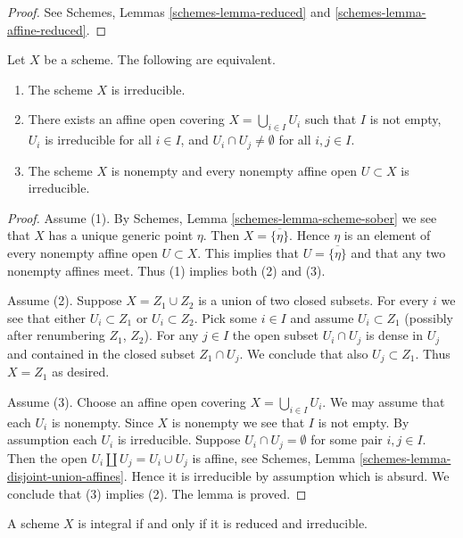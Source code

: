 \begin{proof}
See Schemes, Lemmas \ref{schemes-lemma-reduced} and
\ref{schemes-lemma-affine-reduced}.
\end{proof}

\begin{lemma}
\label{lemma-characterize-irreducible}
Let $X$ be a scheme.
The following are equivalent.
\begin{enumerate}
\item The scheme $X$ is irreducible.
\item There exists an affine open covering $X = \bigcup_{i \in I} U_i$
such that $I$ is not empty, $U_i$ is irreducible for all $i \in I$, and
$U_i \cap U_j \not = \emptyset$ for all $i, j \in I$.
\item The scheme $X$ is nonempty and every nonempty affine open
$U \subset X$ is irreducible.
\end{enumerate}
\end{lemma}

\begin{proof}
Assume (1). By Schemes, Lemma \ref{schemes-lemma-scheme-sober}
we see that $X$ has a unique generic point $\eta$. Then
$X = \overline{\{\eta\}}$. Hence $\eta$ is an element of
every nonempty affine open $U \subset X$. This implies
that $U = \overline{\{\eta\}}$ and that any two nonempty affines
meet. Thus (1) implies both (2) and (3).

\medskip\noindent
Assume (2). Suppose $X = Z_1 \cup Z_2$ is a union of two closed subsets.
For every $i$ we see that either $U_i \subset Z_1$ or $U_i \subset Z_2$.
Pick some $i \in I$ and assume $U_i \subset Z_1$ (possibly after renumbering
$Z_1$, $Z_2$). For any $j \in I$ the open subset $U_i \cap U_j$ is dense in
$U_j$ and contained in the closed subset $Z_1 \cap U_j$. We conclude that
also $U_j \subset Z_1$. Thus $X = Z_1$ as desired.

\medskip\noindent
Assume (3). Choose an affine open covering $X = \bigcup_{i \in I} U_i$.
We may assume that each $U_i$ is nonempty.
Since $X$ is nonempty we see that $I$ is not empty.
By assumption each $U_i$ is irreducible.
Suppose $U_i \cap U_j = \emptyset$ for some pair $i, j \in I$.
Then the open $U_i \amalg  U_j = U_i \cup U_j$ is affine, see
Schemes, Lemma \ref{schemes-lemma-disjoint-union-affines}.
Hence it is irreducible by assumption which is absurd. We conclude that (3)
implies (2). The lemma is proved.
\end{proof}

\begin{lemma}
\label{lemma-characterize-integral}
A scheme $X$ is integral if and only if it is reduced and irreducible.
\end{lemma}

